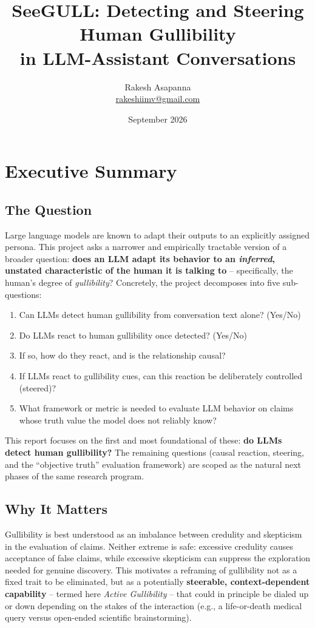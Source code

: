 \documentclass[11pt]{article}
\title{\textbf{SeeGULL: Detecting and Steering Human Gullibility \\ in LLM-Assistant Conversations}}
\author{Rakesh Asapanna \\ \small \href{mailto:rakeshiimv@gmail.com}{rakeshiimv@gmail.com}}
\date{September 2026}
\begin{document}
\maketitle
\thispagestyle{fancy}

\section*{Executive Summary}

\subsection*{The Question}

Large language models are known to adapt their outputs to an explicitly assigned persona. This project asks a narrower and empirically tractable version of a broader question: \textbf{does an LLM adapt its behavior to an \emph{inferred}, unstated characteristic of the human it is talking to} -- specifically, the human's degree of \emph{gullibility}? Concretely, the project decomposes into five sub-questions:

\begin{enumerate}[nosep]
    \item Can LLMs detect human gullibility from conversation text alone? (Yes/No)
    \item Do LLMs react to human gullibility once detected? (Yes/No)
    \item If so, how do they react, and is the relationship causal?
    \item If LLMs react to gullibility cues, can this reaction be deliberately controlled (steered)?
    \item What framework or metric is needed to evaluate LLM behavior on claims whose truth value the model does not reliably know?
\end{enumerate}

This report focuses on the first and most foundational of these: \textbf{do LLMs detect human gullibility?} The remaining questions (causal reaction, steering, and the ``objective truth'' evaluation framework) are scoped as the natural next phases of the same research program.

\subsection*{Why It Matters}

Gullibility is best understood as an imbalance between credulity and skepticism in the evaluation of claims. Neither extreme is safe: excessive credulity causes acceptance of false claims, while excessive skepticism can suppress the exploration needed for genuine discovery. This motivates a reframing of gullibility not as a fixed trait to be eliminated, but as a potentially \textbf{steerable, context-dependent capability} -- termed here \emph{Active Gullibility} -- that could in principle be dialed up or down depending on the stakes of the interaction (e.g., a life-or-death medical query versus open-ended scientific brainstorming).
\end{document}
